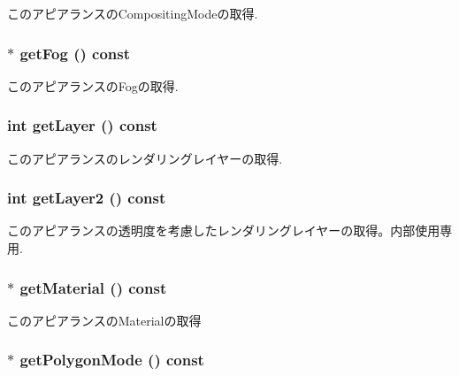 このアピアランスのCompositingModeの取得. \hypertarget{classm3g_1_1Appearance_93143a921b998ff69576147a59eb44d4}{
\subsubsection[{getFog}]{ $\ast$ getFog () const}}
\label{classm3g_1_1Appearance_93143a921b998ff69576147a59eb44d4}


このアピアランスのFogの取得. \hypertarget{classm3g_1_1Appearance_df831e0e0ebf9d7e997150e497e6a6cf}{
\subsubsection[{getLayer}]{\setlength{\rightskip}{0pt plus 5cm}int getLayer () const}}
\label{classm3g_1_1Appearance_df831e0e0ebf9d7e997150e497e6a6cf}


このアピアランスのレンダリングレイヤーの取得. \hypertarget{classm3g_1_1Appearance_0843200b0a6a79f7753380e833a1af0c}{
\subsubsection[{getLayer2}]{\setlength{\rightskip}{0pt plus 5cm}int getLayer2 () const}}
\label{classm3g_1_1Appearance_0843200b0a6a79f7753380e833a1af0c}


このアピアランスの透明度を考慮したレンダリングレイヤーの取得。内部使用専用. \hypertarget{classm3g_1_1Appearance_a412c7074ed5d51f6b8b6fd89275c405}{
\subsubsection[{getMaterial}]{ $\ast$ getMaterial () const}}
\label{classm3g_1_1Appearance_a412c7074ed5d51f6b8b6fd89275c405}


このアピアランスのMaterialの取得 \hypertarget{classm3g_1_1Appearance_dd3ddcefcd18339150d281b155602886}{
\subsubsection[{getPolygonMode}]{ $\ast$ getPolygonMode () const}}
\label{classm3g_1_1Appearance_dd3ddcefcd18339150d281b155602886}


